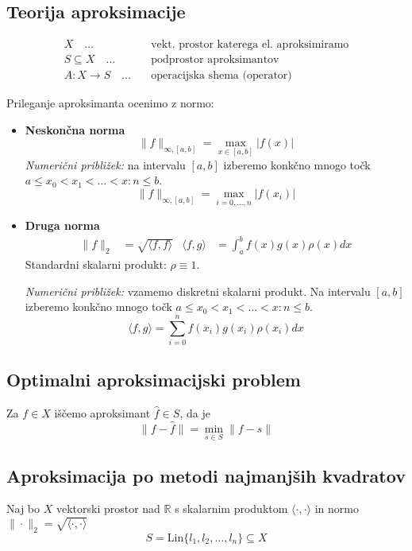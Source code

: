 
 

\begin{multicols}{5}
\setlength{\premulticols}{1pt}
\setlength{\postmulticols}{1pt}
\setlength{\multicolsep}{1pt}
\setlength{\columnsep}{2pt}

\section*{Teorija aproksimacije}
\begin{align*}
    X\quad \dots& \quad \text{vekt. prostor katerega el. aproksimiramo} \\
    S \subseteq X \quad \dots& \quad  \text{podprostor aproksimantov} \\
    A: X \to S \quad \dots& \quad \text{operacijska shema (operator)}
\end{align*}

Prileganje aproksimanta ocenimo z normo:
\begin{itemize}
    \item \textbf{Neskončna norma} 
    \[ \| f \|_{\infty, [a,b]} = \max_{x \in [a, b]} | f(x) | \]
    \textit{Numerični približek:} na intervalu $[a, b]$ izberemo konkčno mnogo točk $a \leq x_0 < x_1 < \dots < x:n \leq b$. 
    \[ \| f \|_{\infty, [a,b]} = \max_{i = 0, \dots, n} | f(x_i) | \]
    \item \textbf{Druga norma} 
    \begin{align*}
        \| f \|_{2} &= \sqrt{\langle f, f \rangle} &
        \langle f, g \rangle &= \int_a^b f(x) g(x) \rho(x) dx 
    \end{align*}
    Standardni skalarni produkt: $\rho \equiv 1$.

    \textit{Numerični približek:} vzamemo diskretni skalarni produkt.
    Na intervalu $[a, b]$ izberemo konkčno mnogo točk $a \leq x_0 < x_1 < \dots < x:n \leq b$.
    \[\langle f, g \rangle = \sum_{i=0}^n f(x_i) g(x_i) \rho(x_i) dx\]
\end{itemize}

\subsection*{Optimalni aproksimacijski problem}
Za $f \in X$ iščemo aproksimant $\hat{f} \in S$, da je
\[ \| f - \hat{f} \| = \min_{s \in S} \| f - s \| \]

\subsection*{Aproksimacija po metodi najmanjših kvadratov}
Naj bo $X$ vektorski prostor nad $\mathbb{R}$ s skalarnim produktom $\langle \cdot, \cdot \rangle$ in normo $\| \cdot \|_2 = \sqrt{\langle \cdot, \cdot \rangle}$ 
\[ S = \text{Lin}\{l_1, l_2, \dots, l_n\} \subseteq X \]


\end{multicols}
